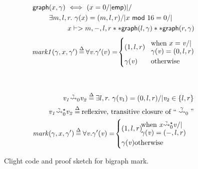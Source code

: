 \documentclass[acmsmall,review,anonymous]{acmart}\settopmatter{printfolios=true,printccs=false,printacmref=false}
\newcommand{\defeq}{\mathbin{\stackrel{\Delta}{=}}}
\newcommand{\p}[1]{\ensuremath{\mathsf{#1}}} \newcommand{\m}[1]{\ensuremath{\mathit{#1}}} \newcommand{\ma}[1]{\ensuremath{\mathcal{#1}}} \let\ramify\lightning
\begin{document}
\begin{figure}[t]
{\footnotesize
\begin{flushleft}
\begin{minipage}[c]{0.5\textwidth}
\begin{equation}
\label{eqn:bigraphintrofoldunfold}
\begin{split}
\quad \p{graph}&(x, \gamma) ~ <=> ~ (x = 0 /| \p{emp}) |/ \null \\
& \exists m,l,r.~ \gamma(x)=(m,l,r) /| x~\mathsf{mod}~16 = 0 /| \null \\
& \qquad ~~ x |-> m,-,l,r ** \p{graph}(l, \gamma) ** \p{graph}(r, \gamma)
\end{split}
\end{equation}
\begin{equation*}
\begin{array}{l@{\hspace{2pt}}c@{\hspace{2pt}}l}
\quad \m{mark1}(\gamma,x,\gamma') & \defeq & \forall \m{v}. \gamma'(v) = \! \begin{cases}
(1,l,r) \! & \begin{array}{@{}l@{}}\text{when } x = \m{v} /| \null \\[-3pt] \gamma(\m{v}) = (0,l,r) \end{array} \\
\gamma(\m{v}) & \text{otherwise}
\end{cases}
\end{array}
\end{equation*}
\end{minipage}
~~ \vline
\begin{minipage}[c]{0.4\textwidth}
\begin{equation*}
\begin{split}
\m{v_1} \accentset{\gamma}{\leadsto}_0 \m{v_2} \defeq \exists l,r.~ \gamma(\m{v}_1) = (0,l,r) /| \m{v}_2 \in \{ l,r\} \\
\m{v_1} \accentset{\gamma}{\leadsto}^{\star}_0 \m{v_2} \defeq \text{reflexive, transitive closure of ``}\mathrel{{\stackrel{\gamma}{\leadsto}}_{0}}\text{''}
\\
\quad \m{mark}(\gamma,x,\gamma') \defeq
\forall \m{v}. \gamma'(\m{v}) = \!
\begin{cases}
(1,l,r) \!
\begin{array}{@{}l@{}}\text{when }
\m{x} \accentset{\gamma}{\leadsto}^{\star}_0 \m{v} /| \null \\[-3pt] \gamma(\m{v}) = (-,l,r)
\end{array}\\
\gamma(\m{v}) \text{otherwise}
\end{cases}
\end{split}
\end{equation*}
\end{minipage}
\end{flushleft}
}

\vspace{-0.4em}
\caption{Clight code and proof sketch for bigraph mark.}
\label{fig:markgraph}
\vspace{-1em}
\end{figure}
\end{document}
